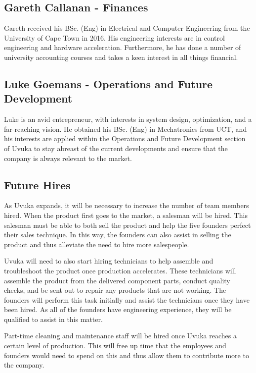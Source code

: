 \subsection{Gareth Callanan - Finances}
Gareth received his BSc. (Eng) in Electrical and Computer Engineering from the University of Cape Town in 2016. His engineering interests are in control engineering and hardware acceleration. Furthermore, he has done a number of university accounting courses and takes a keen interest in all things financial. 

\subsection{Luke Goemans - Operations and Future Development}
Luke is an avid entrepreneur, with interests in system design, optimization, and a far-reaching vision. He obtained his BSc. (Eng) in Mechatronics from UCT, and his interests are applied within the Operations and Future Development section of Uvuka to stay abreast of the current developments and ensure that the company is always relevant to the market.

\subsection{Future Hires}
As Uvuka expands, it will be necessary to increase the number of team members hired. When the product first goes to the market, a salesman will be hired. This salesman must be able to both sell the product and help the five founders perfect their sales technique. In this way, the founders can also assist in selling the product and thus alleviate the need to hire more salespeople.

\pagebreak

Uvuka will need to also start hiring technicians to help assemble and troubleshoot the product once production accelerates. These technicians will assemble the product from the delivered component parts, conduct quality checks, and be sent out to repair any products that are not working. The founders will perform this task initially and assist the technicians once they have been hired. As all of the founders have engineering experience, they will be qualified to assist in this matter.

Part-time cleaning and maintenance staff will be hired once Uvuka reaches a certain level of production. This will free up time that the employees and founders would need to spend on this and thus allow them to contribute more to the company.

